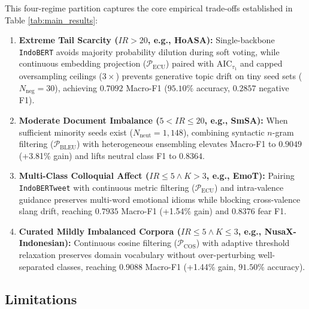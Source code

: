 \documentclass{ieeeaccess}
\begin{document}
This four-regime partition captures the core empirical trade-offs established in Table \ref{tab:main_results}:
\begin{enumerate}
    \item \textbf{Extreme Tail Scarcity ($IR > 20$, e.g., HoASA):} Single-backbone \texttt{IndoBERT} avoids majority probability dilution during soft voting, while continuous embedding projection ($\mathcal{P}_{\text{ECU}}$) paired with $\text{AIC}_{\tau_1}$ and capped oversampling ceilings ($3\times$) prevents generative topic drift on tiny seed sets ($N_{\text{neg}} = 30$), achieving $0.7092$ Macro-F1 ($95.10\%$ accuracy, $0.2857$ negative F1).
    \item \textbf{Moderate Document Imbalance ($5 < IR \le 20$, e.g., SmSA):} When sufficient minority seeds exist ($N_{\text{neut}} = 1{,}148$), combining syntactic $n$-gram filtering ($\mathcal{P}_{\text{BLEU}}$) with heterogeneous ensembling elevates Macro-F1 to $0.9049$ (+3.81\% gain) and lifts neutral class F1 to $0.8364$.
    \item \textbf{Multi-Class Colloquial Affect ($IR \le 5 \land K > 3$, e.g., EmoT):} Pairing \texttt{IndoBERTweet} with continuous metric filtering ($\mathcal{P}_{\text{ECU}}$) and intra-valence guidance preserves multi-word emotional idioms while blocking cross-valence slang drift, reaching $0.7935$ Macro-F1 (+1.54\% gain) and $0.8376$ fear F1.
    \item \textbf{Curated Mildly Imbalanced Corpora ($IR \le 5 \land K \le 3$, e.g., NusaX-Indonesian):} Continuous cosine filtering ($\mathcal{P}_{\text{COS}}$) with adaptive threshold relaxation preserves domain vocabulary without over-perturbing well-separated classes, reaching $0.9088$ Macro-F1 (+1.44\% gain, $91.50\%$ accuracy).
\end{enumerate}


\subsection{Limitations}
\label{subsec:limitations}
\end{document}
